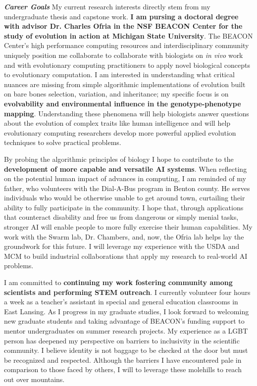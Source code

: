\textit{\textbf{Career Goals}}
My current research interests directly stem from my undergraduate thesis and capstone work.
\textbf{I am pursing a doctoral degree with advisor Dr. Charles Ofria in the NSF BEACON Center for the study of evolution in action at Michigan State University}.
The BEACON Center's high performance computing resources and interdisciplinary community uniquely position me collaborate to collaborate with biologists on \textit{in vivo} work and with evolutionary computing practitioners to apply novel biological concepts to evolutionary computation.
I am interested in understanding what critical nuances are missing from simple algorithmic implementations of evolution built on bare bones selection, variation, and inheritance;
my specific focus is on \textbf{evolvability and environmental influence in the genotype-phenotype mapping}.
Understanding these phenomena will help biologists answer questions about the evolution of complex traits like human intelligence and will help evolutionary computing researchers develop more powerful applied evolution techniques to solve practical problems.

By probing the algorithmic principles of biology I hope to contribute to the \textbf{development of more capable and versatile AI systems}.
When reflecting on the potential human impact of advances in computing, I am reminded of my father, who volunteers with the Dial-A-Bus program in Benton county.
He serves individuals who would be otherwise unable to get around town, curtailing their ability to fully participate in the community.
I hope that, through applications that counteract disability and free us from dangerous or simply menial tasks, stronger AI will enable people to more fully exercise their human capabilities.
My work with the Swarm lab, Dr. Chambers, and, now, the Ofria lab helps lay the groundwork for this future.
I will leverage my experience with the USDA and MCM to build industrial collaborations that apply my research to real-world AI problems.

I am committed to \textbf{continuing my work fostering community among scientists and performing STEM outreach}.
I currently volunteer four hours a week as a teacher's assistant in special and general education classrooms in East Lansing.
As I progress in my graduate studies, I look forward to welcoming new graduate students and taking advantage of BEACON's funding support to mentor undergraduates on summer research projects.
My experience as a LGBT person has deepened my perspective on barriers to inclusivity in the scientific community.
I believe identity is not baggage to be checked at the door but must be recognized and respected.
Although the barriers I have encountered pale in comparison to those faced by others, I will to leverage these molehills to reach out over mountains.
